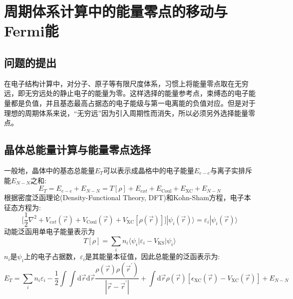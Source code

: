 \documentclass{article}      %
\newcommand{\upcite}[1]{\hspace{0ex}\textsuperscript{\cite{#1}}} %
\begin{document}
\section{周期体系计算中的能量零点的移动与\textrm{Fermi}能}
\subsection{问题的提出}
在电子结构计算中，对分子、原子等有限尺度体系，习惯上将能量零点取在无穷远，即无穷远处的静止电子的能量为零。这样选择的能量参考点，束缚态的电子能量都是负值，并且基态最高占据态的电子能级与第一电离能的负值对应。但是对于理想的周期体系来说，“无穷远”因为引入周期性而消失，所以必须另外选择能量零点。\upcite{JPC-SSP12-4409_1979,XIE-LU}

\subsection{晶体总能量计算与能量零点选择}
一般地，晶体中的基态总能量$E_T$可以表示成晶格中的电子能量$E_{e-e}$与离子实排斥能$E_{N-N}$之和:~
	\begin{equation}
		E_T=E_{e-e}+E_{N-N}=T[\rho]+E_{ext}+E_{\mathrm{Coul}}+E_{\mathrm{XC}}+E_{N-N}
		\label{eq:Crystal_ENE_R}
	\end{equation}
根据密度泛函理论(\textrm{Density-Functional Theory, DFT})和\textrm{Kohn-Sham}方程\upcite{PRB136-864_1964,PRA140-1133_1965}，电子本征态方程为:~
\begin{equation}
	\bigg[\dfrac12\nabla^2+V_{ext}(\vec r)+V_{\mathrm{Coul}}(\vec r)+V_{\mathrm{XC}}[\rho(\vec r)]\bigg]|\psi_i(\vec r)\rangle=\varepsilon_i|\psi_i(\vec r)\rangle
	\label{eq:DFT}
\end{equation}
动能泛函用单电子能量表示为
\begin{equation}
	T[{\rho}]=\sum_in_i\langle\psi_i|\varepsilon_i-V_{\mathrm{KS}}|\psi_i\rangle
	\label{eq:DFT_Kin}
\end{equation}
$n_i$是$\psi_i$上的电子占据数，$\varepsilon_i$是其能量本征值，因此总能量的泛函表示为:
\begin{equation}
	E_T=\sum_in_i\varepsilon_i-\dfrac12\int\int\mathrm{d}\vec r\mathrm{d}\vec r\dfrac{\rho(\vec r)\rho(\vec r^{\prime})}{|\vec r-\vec r^{\prime}|}+\int\mathrm{d}\vec r\rho(\vec r)[\epsilon_{\mathrm{XC}}(\vec r)-V_{\mathrm{XC}}(\vec r)]+E_{N-N}
	\label{eq:DFT_ENE_R}
	\end{equation}
\end{document}
